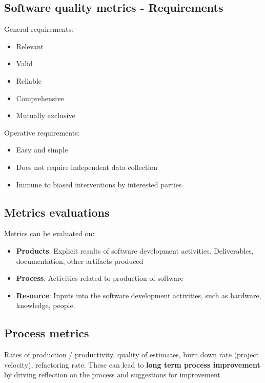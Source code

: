 \documentclass{article}
\begin{document}
\subsection{Software quality metrics - Requirements}

\begin{flushleft}
General	requirements:
\begin{itemize}
  \item Relevant
  \item Valid
  \item Reliable
  \item Comprehensive 
  \item Mutually exclusive
\end{itemize}
Operative requirements:
\begin{itemize}
  \item Easy and simple 
  \item Does not require independent data collection 
  \item Immune to biased interventions by interested parties
\end{itemize}
\end{flushleft}

\subsection{Metrics evaluations}

\begin{flushleft}
Metrics can be evaluated on:
\begin{itemize}
  \item \textbf{Products}: Explicit results of software development activities. Deliverables, documentation, other artifacts produced
  \item \textbf{Process}: Activities	related	to	production	of	software
  \item \textbf{Resource}: Inputs into the software development activities, such as hardware, knowledge, people.
\end{itemize}
\end{flushleft}

\subsection{Process metrics}

\begin{flushleft}
Rates of production / productivity, quality of estimates, burn down rate (project velocity), refactoring rate. These can lead to \textbf{long term process improvement} by driving reflection on the process and suggestions for improvement
\end{flushleft}
\end{document}
